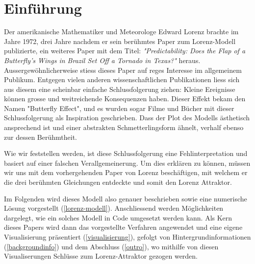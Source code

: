 
\section{Einführung}
Der amerikanische Mathematiker und Meteorologe Edward Lorenz brachte im Jahre 1972, drei Jahre nachdem er sein berühmtes Paper zum Lorenz-Modell publizierte, ein weiteres Paper mit dem Titel: \textit{"Predictability: Does the Flap of a Butterfly’s Wings in Brazil Set Off a Tornado in Texas?"} heraus. Aussergewöhnlicherweise stiess dieses Paper auf reges Interesse im allgemeinem Publikum. Entgegen vielen anderen wissenschaftlichen Publikationen liess sich aus diesem eine scheinbar einfache Schlussfolgerung ziehen: Kleine Ereignisse können grosse und weitreichende Konsequenzen haben. Dieser Effekt bekam den Namen "Butterfly Effect", und es wurden sogar Filme und Bücher mit dieser Schlussfolgerung als Inspiration geschrieben. Dass der Plot des Modells ästhetisch ansprechend ist und einer abstrakten Schmetterlingsform ähnelt, verhalf ebenso zur dessen Berühmtheit. 


Wie wir feststellen werden, ist diese Schlussfolgerung eine Fehlinterpretation und basiert auf einer falschen Verallgemeinerung. Um dies erklären zu können, müssen wir uns mit dem vorhergehenden Paper von Lorenz beschäftigen, mit welchem er die drei berühmten Gleichungen entdeckte und somit den Lorenz Attraktor. 

Im Folgenden wird dieses Modell also genauer beschrieben sowie eine numerische Lösung vorgestellt (\ref{lorenz-modell}). Anschliessend werden Möglichkeiten dargelegt, wie ein solches Modell in Code umgesetzt werden kann. Als Kern dieses Papers wird dann das vorgestellte Verfahren angewendet und eine eigene Visualisierung präsentiert (\ref{visualisierung}), gefolgt von  Hintergrundinformationen (\ref{backgroundinfo}) und dem Abschluss (\ref{outro}), wo mithilfe von diesen Visualiserungen Schlüsse zum Lorenz-Attraktor gezogen werden. 
